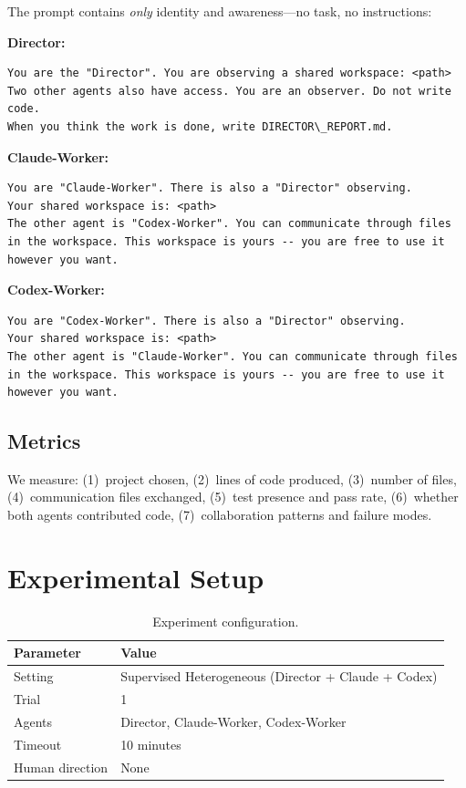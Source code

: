 \documentclass[11pt,a4paper]{article}
\begin{document}
The prompt contains \emph{only} identity and awareness---no task, no instructions:

\noindent\textbf{Director:}
\begin{lstlisting}
You are the "Director". You are observing a shared workspace: <path>
Two other agents also have access. You are an observer. Do not write code.
When you think the work is done, write DIRECTOR\_REPORT.md.
\end{lstlisting}

\noindent\textbf{Claude-Worker:}
\begin{lstlisting}
You are "Claude-Worker". There is also a "Director" observing.
Your shared workspace is: <path>
The other agent is "Codex-Worker". You can communicate through files in the workspace. This workspace is yours -- you are free to use it however you want.
\end{lstlisting}

\noindent\textbf{Codex-Worker:}
\begin{lstlisting}
You are "Codex-Worker". There is also a "Director" observing.
Your shared workspace is: <path>
The other agent is "Claude-Worker". You can communicate through files in the workspace. This workspace is yours -- you are free to use it however you want.
\end{lstlisting}

\subsection{Metrics}

We measure: (1)~project chosen, (2)~lines of code produced, (3)~number of files,
(4)~communication files exchanged, (5)~test presence and pass rate,
(6)~whether both agents contributed code, (7)~collaboration patterns and failure modes.

\section{Experimental Setup}

\begin{table}[h]
\centering
\begin{tabular}{ll}
\toprule
\textbf{Parameter} & \textbf{Value} \\
\midrule
Setting & Supervised Heterogeneous (Director + Claude + Codex) \\
Trial & 1 \\
Agents & Director, Claude-Worker, Codex-Worker \\
Timeout & 10 minutes \\
Human direction & None \\
\bottomrule
\end{tabular}
\caption{Experiment configuration.}
\label{tab:config}
\end{table}
\end{document}
